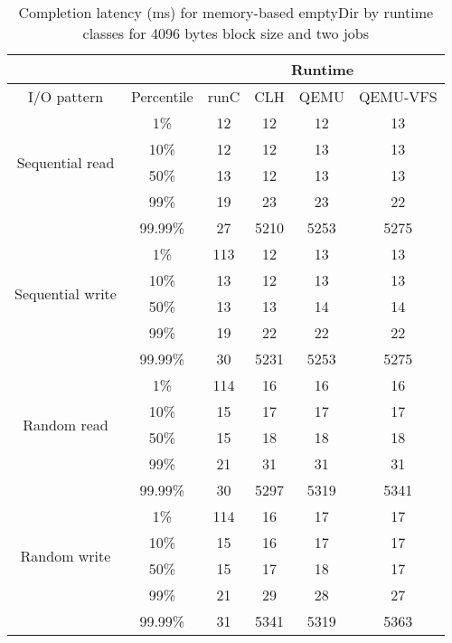 \begin{table}
\centering
\label{table:ResultsEDMEMClatByRTC4096-2}
\caption{Completion latency (ms) for memory-based emptyDir by runtime classes for 4096 bytes block size and two jobs}
\begin{tabular}{ |c|c|c|c|c|c| }
 \hline
 \multicolumn{2}{|c}{} & \multicolumn{4}{|c|}{Runtime} \\
 \hline
 I/O pattern & Percentile & runC & CLH & QEMU & QEMU-VFS \\
 \hline
 \multirow{4}{4em}{Sequential read} & 1\% & 12 & 12 & 12 & 13 \\
 & 10\% & 12 & 12 & 13 & 13 \\
 & 50\% & 13 & 12 & 13 & 13 \\
 & 99\% & 19 & 23 & 23 & 22 \\
 & 99.99\% & 27 & 5210 & 5253 & 5275 \\

 \hline
 \multirow{4}{4em}{Sequential write} & 1\% & 113 & 12 & 13 & 13 \\
 & 10\% & 13 & 12 & 13 & 13 \\
 & 50\% & 13 & 13 & 14 & 14 \\
 & 99\% & 19 & 22 & 22 & 22 \\
 & 99.99\% & 30 & 5231 & 5253 & 5275 \\
 \hline
 \multirow{4}{4em}{Random read} & 1\% & 114 & 16 & 16 & 16 \\
 & 10\% & 15 & 17 & 17 & 17 \\
 & 50\% & 15 & 18 & 18 & 18 \\
 & 99\% & 21 & 31 & 31 & 31 \\
 & 99.99\% & 30 & 5297 & 5319 & 5341 \\
 \hline
 \multirow{4}{4em}{Random write} & 1\% & 114 & 16 & 17 & 17 \\
 & 10\% & 15 & 16 & 17 & 17 \\
 & 50\% & 15 & 17 & 18 & 17 \\
 & 99\% & 21 & 29 & 28 & 27 \\
 & 99.99\% & 31 & 5341 & 5319 & 5363 \\
 \hline
\end{tabular}
\end{table}